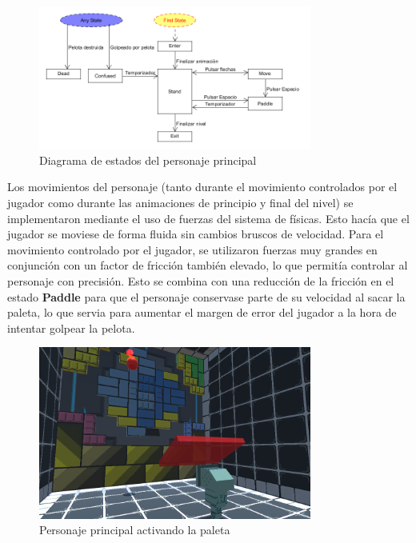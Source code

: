 \begin{figure}[h]
	\includegraphics[width=0.8\textwidth]{images/estructura/fisica/player}
	\centering
	\caption{Diagrama de estados del personaje principal}
\end{figure}

Los movimientos del personaje (tanto durante el movimiento controlados por el jugador como durante las animaciones de principio y final del nivel) se implementaron mediante el uso de fuerzas del sistema de físicas. Esto hacía que el jugador se moviese de forma fluida sin cambios bruscos de velocidad. Para el movimiento controlado por el jugador, se utilizaron fuerzas muy grandes en conjunción con un factor de fricción también elevado, lo que permitía controlar al personaje con precisión. Esto se combina con una reducción de la fricción en el estado \textbf{Paddle} para que el personaje conservase parte de su velocidad al sacar la paleta, lo que servia para aumentar el margen de error del jugador a la hora de intentar golpear la pelota.

\begin{figure}[h]
	\includegraphics[width=0.8\textwidth]{images/estructura/fisica/flick_paddle}
	\centering
	\caption{Personaje principal activando la paleta}
\end{figure}

